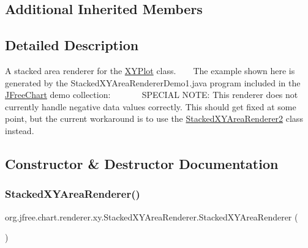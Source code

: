 \subsection*{Additional Inherited Members}


\subsection{Detailed Description}
A stacked area renderer for the \mbox{\hyperlink{}{X\+Y\+Plot}} class. ~\newline
~\newline
 The example shown here is generated by the {\ttfamily Stacked\+X\+Y\+Area\+Renderer\+Demo1.\+java} program included in the \mbox{\hyperlink{classorg_1_1jfree_1_1chart_1_1_j_free_chart}{J\+Free\+Chart}} demo collection\+: ~\newline
~\newline
  ~\newline
~\newline
 S\+P\+E\+C\+I\+AL N\+O\+TE\+: This renderer does not currently handle negative data values correctly. This should get fixed at some point, but the current workaround is to use the \mbox{\hyperlink{classorg_1_1jfree_1_1chart_1_1renderer_1_1xy_1_1_stacked_x_y_area_renderer2}{Stacked\+X\+Y\+Area\+Renderer2}} class instead. 

\subsection{Constructor \& Destructor Documentation}
\mbox{\label{classorg_1_1jfree_1_1chart_1_1renderer_1_1xy_1_1_stacked_x_y_area_renderer_aba9877e3515436e93e892451a011bfdf}} 
\subsubsection{\texorpdfstring{Stacked\+X\+Y\+Area\+Renderer()}{StackedXYAreaRenderer()}\hspace{0.1cm}{\footnotesize\ttfamily [1/3]}}
{\footnotesize\ttfamily org.\+jfree.\+chart.\+renderer.\+xy.\+Stacked\+X\+Y\+Area\+Renderer.\+Stacked\+X\+Y\+Area\+Renderer (\begin{DoxyParamCaption}{ }\end{DoxyParamCaption})}

